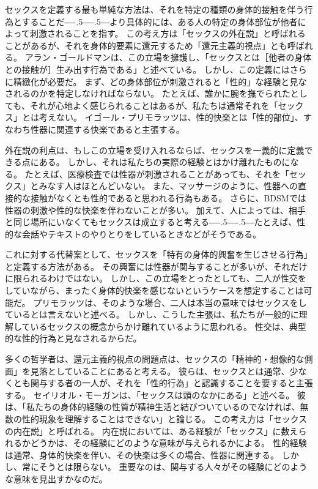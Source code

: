 \documentclass[paper=a4,book,openany]{jlreq}
\newcommand{\ig}[1]{}           %
\def\DDASH{―\kern-.5\zw―\kern-.5\zw―} %
\begin{document}
セックスを定義する最も単純な方法は、それを特定の種類の身体的接触を伴う行為とすることだ{\DDASH}より具体的には、ある人の特定の身体部位が他者によって刺激されることを指す。
この考え方は「セックスの外在説」と呼ばれることがあるが、それを身体的要素に還元するため「還元主義的視点」とも呼ばれる。
アラン・ゴールドマンは、この立場を擁護し、「セックスとは［他者の身体との接触が］生み出す行為である」と述べている\citep[p.268]{goldman77:_plain_sex}。\ig{Alan Goldman}
しかし、この定義にはさらに精緻化が必要だ。
まず、どの身体部位が刺激されると「性的」な経験と見なされるのかを特定しなければならない。
たとえば、誰かに腕を撫でられたとしても、それが心地よく感じられることはあるが、私たちは通常それを「セックス」とは考えない。
イゴール・プリモラッツは、性的快楽とは「性的部位」、すなわち性器に関連する快楽であると主張する\citep[p.46]{primoratz99:_ethic_and_sex}。

外在説の利点は、もしこの立場を受け入れるならば、セックスを一義的に定義できる点にある。
しかし、それは私たちの実際の経験とはかけ離れたものになる。
たとえば、医療検査では性器が刺激されることがあっても、それを「セックス」とみなす人はほとんどいない。
また、マッサージのように、性器への直接的な接触がなくとも性的であると思われる行為もある。
さらに、BDSMでは性器の刺激や性的な快楽を伴わないことが多い。
加えて、人によっては、相手と同じ場所にいなくてもセックスは成立すると考える{\DDASH}たとえば、性的な会話やテキストのやりとりをしているときなどがそうである\citep[pp.19--20]{soble06:_activ_sexual}。

これに対する代替案として、セックスを「特有の身体的興奮を生じさせる行為」と定義する方法がある。
その興奮には性器が関与することが多いが、それだけに限られるわけではない\citep{janssen02:_sexual_inhib_sis1,janssen02:_sexual_inhib_sis2}。
しかし、この立場をとったとしても、二人が性交をしていながら、まったく身体的快楽を感じないというケースを想定することは可能だ。
プリモラッツは、そのような場合、二人は本当の意味ではセックスをしているとは言えないと述べる\citep[pp.47--49]{primoratz99:_ethic_and_sex}。
しかし、こうした主張は、私たちが一般的に理解しているセックスの概念からかけ離れているように思われる。
性交は、典型的な性的行為と見なされるからだ。

多くの哲学者は、還元主義的視点の問題点は、セックスの「精神的・想像的な側面」を見落としていることにあると考える。
彼らは、セックスとは通常、少なくとも関与する者の一人が、それを「性的行為」と認識することを要すると主張する。
セイリオル・モーガン\ig{セイリオル・モーガン}は、「セックスは頭のなかにある」と述べる。
彼は、「私たちの身体的経験の性質が精神生活と結びついているのでなければ、無数の性的現象を理解することはできない」と論じる\citep[p.5]{morgan03:_sex_in_head}。
この考え方は「セックスの内在説」と呼ばれる。
内在説においては、ある経験が「セックス」に数えられるかどうかは、その経験にどのような意味が与えられるかによる。
性的経験は通常、身体的快楽を伴い、その快楽は多くの場合、性器に関連する。
しかし、常にそうとは限らない。
重要なのは、関与する人々がその経験にどのような意味を見出すかなのだ。
\end{document}
